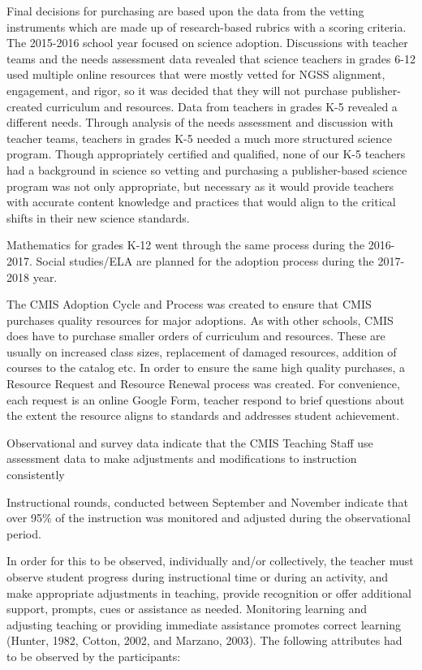 \begin{findings}
Final decisions for purchasing are based upon the data from the vetting instruments which are made up of research-based rubrics with a scoring criteria. The 2015-2016 school year focused on science adoption. Discussions with teacher teams and the needs assessment data revealed that science teachers in grades 6-12 used multiple online resources that were mostly vetted for NGSS alignment, engagement, and rigor, so it was decided that they will not purchase publisher-created curriculum and resources. Data from teachers in grades K-5 revealed a different needs. Through analysis of the needs assessment and discussion with teacher teams, teachers in grades K-5 needed a much more structured science program.  Though appropriately certified and qualified, none of our K-5 teachers had a background in science so vetting and purchasing a publisher-based science program was not only appropriate, but necessary as it would provide teachers with accurate content knowledge and practices that would align to the critical shifts in their new science standards. 

Mathematics for grades K-12 went through the same process during the 2016-2017. Social studies/ELA are planned for the adoption process during the 2017-2018 year. 

The CMIS Adoption Cycle and Process was created to ensure that CMIS purchases quality resources for major adoptions. As with other schools, CMIS does have to purchase smaller orders of curriculum and resources. These are usually on increased class sizes, replacement of damaged resources, addition of courses to the catalog etc. In order to ensure the same high quality purchases, a Resource Request and Resource Renewal process was created. For convenience, each request is an online Google Form, teacher respond to brief questions about the extent the resource aligns to standards and addresses student achievement.


Observational and survey data indicate that the CMIS Teaching Staff use assessment data to make adjustments and modifications to instruction  consistently 

Instructional rounds, conducted between September and November indicate that over 95\% of the instruction was monitored and adjusted during the observational period. 
 
In order for this to be observed, individually and/or collectively, the teacher must observe student progress during instructional time or during an activity, and make appropriate adjustments in teaching, provide recognition or offer additional support, prompts, cues or assistance as needed. Monitoring learning and adjusting teaching or providing immediate assistance promotes correct learning (Hunter, 1982, Cotton, 2002, and Marzano, 2003). The following attributes had to be observed by the participants: 


\end{findings}
